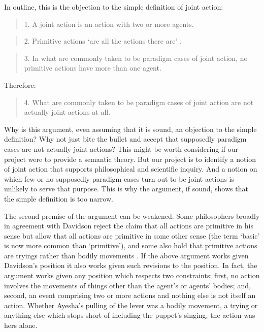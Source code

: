 \documentclass[12pt,a4paper]{extarticle}
\begin{document}
In outline, this is the objection to the simple definition of joint action:
%
\begin{quote}
1. A joint action is an action with two or more agents.
\end{quote}
%
%
\begin{quote}
\label{objection_1_premise_2}
2. Primitive actions `are all the actions there are'
\citep[p.\ 59]{Davidson:1971fz}.
\end{quote}
%
%
\begin{quote}
3. In what are commonly taken to be paradigm cases of joint action, no  primitive actions have more than one agent.
\end{quote}
%
Therefore:
%
\begin{quote}
4. What are commonly taken to be paradigm cases of joint action are not actually joint actions at all.
\end{quote}
%
Why is this argument, even assuming that it is sound, an objection to the simple definition?
Why not just bite the bullet and accept that supposedly paradigm cases are not actually joint actions?
This might be worth considering if our project were to provide a semantic theory.
But our project is to identify a notion of joint action that supports philosophical and scientific inquiry.
And a notion on which few or no supposedly paradigm cases turn out to be joint actions is unlikely to serve that purpose.%
%
%
This is why the argument, if sound, shows that the simple definition is too narrow.

The second premise of the argument can be weakened.
Some philosophers broadly in agreement with Davidson reject the claim that all actions are primitive in his sense but allow that all actions are primitive in some other sense (the term `basic' is now more common than `primitive'), and some also hold that primitive actions are tryings rather than bodily movements \citep[e.g.][]{hornsby_actions_1980}.  
If the above argument works given Davidson's position it also works given such revisions to the position.
In fact, the argument works given any position which respects two constraints: first, no action involves the movements of things other than the agent's or agents' bodies; and, second, an event comprising two or more actions and nothing else is not itself an action.
Whether Ayesha's pulling of the lever was a bodily movement, a trying or anything else which stops short of including the puppet's singing, the action was hers alone.
\end{document}
